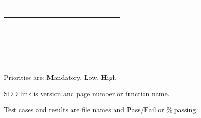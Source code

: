 \documentclass[twoside,letterpaper]{article}
\begin{document}
\begin{flushleft}
\begin{supertabular}{m{0.9212598in}|m{0.42125985in}|m{1.9212599in}|m{0.39275986in}|m{0.7587598in}|m{0.6622598in}|m{0.5462598in}|m{0.6712598in}|m{0.6087598in}|m{0.6712598in}|m{0.6295598in}|}
~
 &
~
 &
~
 &
~
 &
~
 &
~
 &
~
 &
~
 &
~
\\\hline
{} &
 &
~
 &
~
 &
~
 &
~
 &
~
 &
~
 &
~
 &
~
 &
~
\\\hline
 &
 &
~
 &
~
 &
~
 &
~
 &
~
 &
~
 &
~
 &
~
 &
~
\\\hhline{~----------}
 &
 &
~
 &
~
 &
~
 &
~
 &
~
 &
~
 &
~
 &
~
 &
~
\\\hline
{} &
 &
~
 &
~
 &
~
 &
~
 &
~
 &
~
 &
~
 &
~
 &
~
\\\hline
\end{supertabular}
\end{flushleft}
{\color{black}
Priorities are: \textbf{M}andatory, \textbf{L}ow, \textbf{H}igh}

{\color{black}
SDD link is version and page number or function name.}

{\color{black}
Test cases and results are file names and \textbf{P}ass/\textbf{F}ail or \% passing.}


\bigskip
\end{document}
